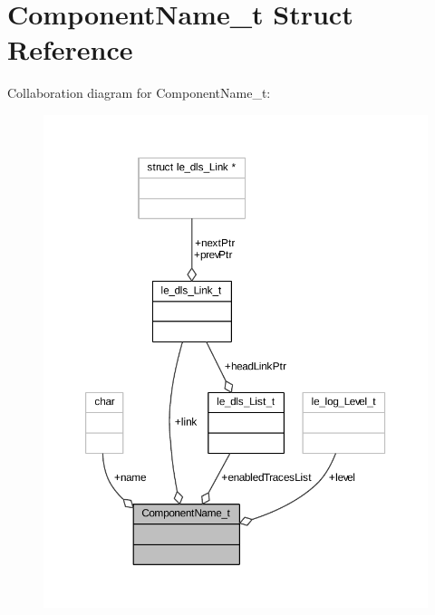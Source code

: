 \hypertarget{struct_component_name__t}{}\section{Component\+Name\+\_\+t Struct Reference}
\label{struct_component_name__t}


Collaboration diagram for Component\+Name\+\_\+t\+:
\nopagebreak
\begin{figure}[H]
\begin{center}
\leavevmode
\includegraphics[width=350pt]{struct_component_name__t__coll__graph}
\end{center}
\end{figure}
